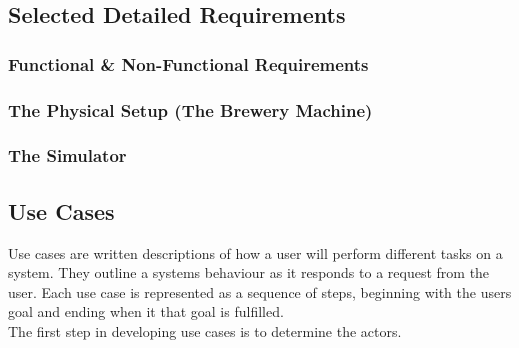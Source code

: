 \subsection{Selected Detailed Requirements}

\subsubsection{Functional \& Non-Functional Requirements}

\subsubsection{The Physical Setup (The Brewery Machine)}

\subsubsection{The Simulator}


\subsection{Use Cases}
Use cases are written descriptions of how a user will perform different tasks
on a system. They outline a systems behaviour as it responds to a request from
the user. Each use case is represented as a sequence of steps, beginning with
the users goal and ending when it that goal is fulfilled. \\

The first step in developing use cases is to determine the actors.



